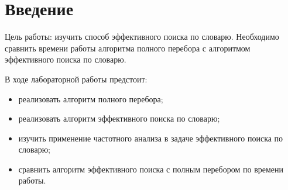 \chapter*{Введение}


Цель работы: изучить способ эффективного поиска по словарю. Необходимо сравнить времени работы алгоритма полного перебора с алгоритмом эффективного поиска по словарю.

В ходе лабораторной работы предстоит:

\begin{itemize}
	\item реализовать алгоритм полного перебора;

	\item реализовать алгоритм эффективного поиска по словарю;
	
	\item изучить применение частотного анализа в задаче эффективного поиска по словарю;
	
	\item сравнить алгоритм эффективного поиска с полным перебором по времени работы.
\end{itemize}

